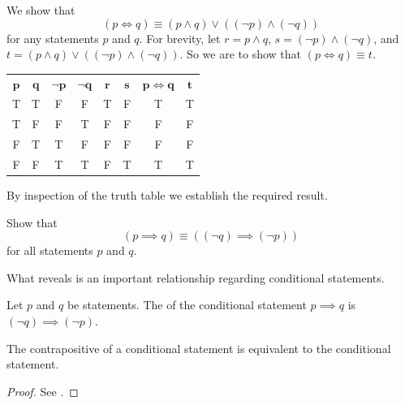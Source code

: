 \begin{example}
    We show that
    \[
        (p \iff q) \equiv (p \land q) \lor ((\lnot p) \land (\lnot q))
    \]
    for any statements $p$ and $q$. For brevity, let $r = p \land q$, $s = (\lnot p) \land (\lnot q)$, and $t = (p \land q) \lor ((\lnot p) \land (\lnot q))$. So we are to show that $(p \iff q) \equiv t$.
    \begin{table}[H]
        \centering
        \begin{tabular}{|c|c||c|c|c|c||c|c|}
            \hline
            $\boldsymbol{p}$ & $\boldsymbol{q}$ & $\boldsymbol{\lnot p}$ & $\boldsymbol{\lnot q}$ & $\boldsymbol{r}$ & $\boldsymbol{s}$ & $\boldsymbol{p \iff q}$ & $\boldsymbol{t}$ \\ \hhline{|=|=#=|=|=|=#=|=|}
            T & T & F & F & T & F & T & T \\ \hline
            T & F & F & T & F & F & F & F \\ \hline
            F & T & T & F & F & F & F & F \\ \hline
            F & F & T & T & F & T & T & T \\ \hline
        \end{tabular}
    \end{table}
    By inspection of the truth table we establish the required result.
\end{example}

\begin{exercise}\label{exercise:contrapositive}
    Show that
    \[
        (p \implies q) \equiv ((\lnot q) \implies (\lnot p))
    \]
    for all statements $p$ and $q$. 
\end{exercise}

What  reveals is an important relationship regarding conditional statements.

\begin{definition}[Contrapositive]
    Let $p$ and $q$ be statements. The  of the conditional statement $p \implies q$ is $(\lnot q) \implies (\lnot p)$.
\end{definition}
\begin{proposition}
    The contrapositive of a conditional statement is equivalent to the conditional statement.
\end{proposition}
\begin{proof}
    See .
\end{proof}

